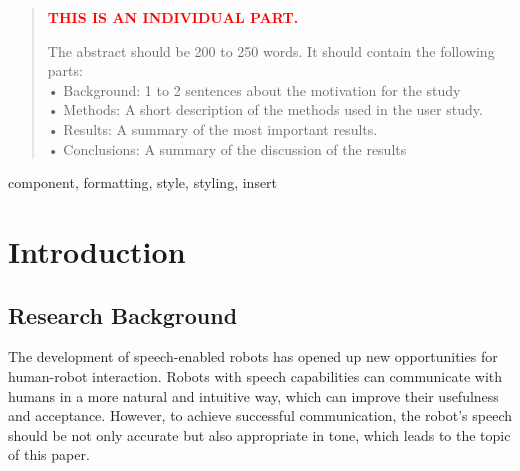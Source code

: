 \documentclass[conference]{IEEEtran}
\begin{document}
\begin{abstract}

\textcolor{red}{\textbf{THIS IS AN INDIVIDUAL PART.}}

\color{blue}
The abstract should be 200 to 250 words. It should contain the following parts: \\
• Background: 1 to 2 sentences about the motivation for the study\\
• Methods: A short description of the methods used in the user study.\\
• Results: A summary of the most important results.\\
• Conclusions: A summary of the discussion of the results


\end{abstract}

\begin{IEEEkeywords}
component, formatting, style, styling, insert
\end{IEEEkeywords}

\section{Introduction}

\subsection{Research Background}
The development of speech-enabled robots has opened up new opportunities for human-robot interaction. Robots with speech capabilities can communicate with humans in a more natural and intuitive way, which can improve their usefulness and acceptance. However, to achieve successful communication, the robot's speech should be not only accurate but also appropriate in tone, which leads to the topic of this paper.
\end{document}
